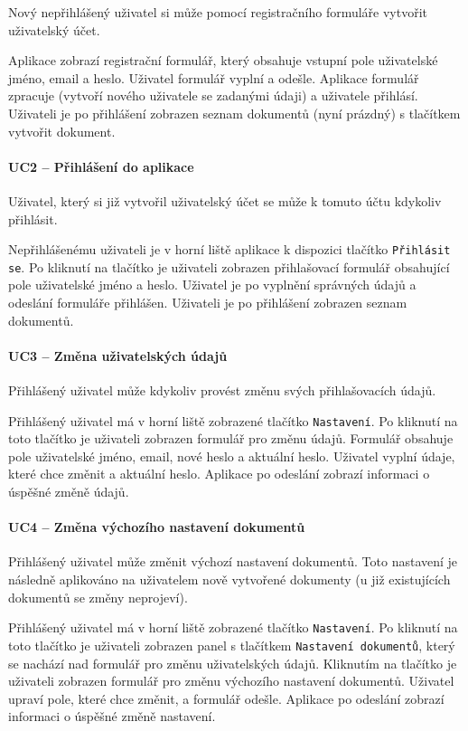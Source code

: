Nový nepřihlášený uživatel si může pomocí registračního formuláře vytvořit uživatelský účet.

Aplikace zobrazí registrační formulář, který obsahuje vstupní pole uživatelské jméno, email a heslo.
Uživatel formulář vyplní a odešle.
Aplikace formulář zpracuje (vytvoří nového uživatele se zadanými údaji) a uživatele přihlásí.
Uživateli je po přihlášení zobrazen seznam dokumentů (nyní prázdný) s tlačítkem vytvořit dokument.

\paragraph{UC2 -- Přihlášení do aplikace}

Uživatel, který si již vytvořil uživatelský účet se může k tomuto účtu kdykoliv přihlásit.

Nepřihlášenému uživateli je v horní liště aplikace k dispozici tlačítko \texttt{Při\-hlásit se}.
Po kliknutí na tlačítko je uživateli zobrazen přihlašovací formulář obsahující pole uživatelské jméno a heslo.
Uživatel je po vyplnění správných údajů a odeslání formuláře přihlášen.
Uživateli je po přihlášení zobrazen seznam dokumentů.

\paragraph{UC3 -- Změna uživatelských údajů}

Přihlášený uživatel může kdykoliv provést změnu svých přihlašovacích údajů.

Přihlášený uživatel má v horní liště zobrazené tlačítko \texttt{Nastavení}.
Po kliknutí na toto tlačítko je uživateli zobrazen formulář pro změnu údajů.
Formulář obsahuje pole uživatelské jméno, email, nové heslo a aktuální heslo.
Uživatel vyplní údaje, které chce změnit a aktuální heslo.
Aplikace po odeslání zobrazí informaci o úspěšné změně údajů.

\paragraph{UC4 -- Změna výchozího nastavení dokumentů}

Přihlášený uživatel může změnit výchozí nastavení dokumentů.
Toto nastavení je následně aplikováno na uživatelem nově vytvořené dokumenty (u již existujících dokumentů se změny neprojeví).

Přihlášený uživatel má v horní liště zobrazené tlačítko \texttt{Nastavení}.
Po kliknutí na toto tlačítko je uživateli zobrazen panel s tlačítkem \texttt{Nastavení dokumentů}, který se nachází nad formulář pro změnu uživatelských údajů.
Kliknutím na tlačítko je uživateli zobrazen formulář pro změnu výchozího nastavení dokumentů.
Uživatel upraví pole, které chce změnit, a formulář odešle.
Aplikace po odeslání zobrazí informaci o úspěšné změně nastavení.


